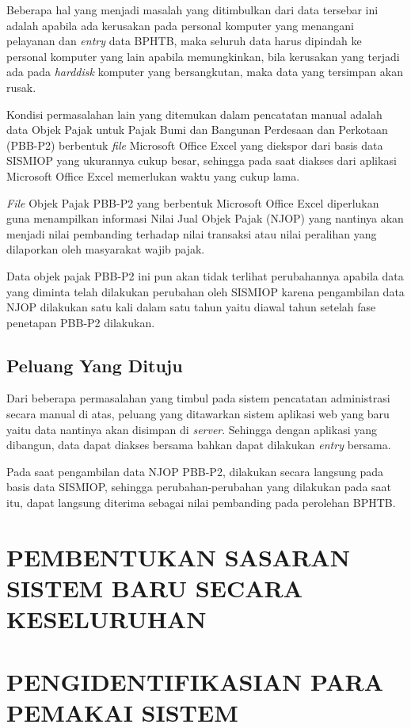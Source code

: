 \documentclass[pdftex,12pt, oneside]{article}
\begin{document}
Beberapa hal yang menjadi masalah yang ditimbulkan dari data tersebar ini adalah apabila ada kerusakan pada personal komputer yang menangani pelayanan dan \textit{entry} data BPHTB, maka seluruh data harus dipindah ke personal komputer yang lain apabila memungkinkan, bila kerusakan yang terjadi ada pada \textit{harddisk} komputer yang bersangkutan, maka data yang tersimpan akan rusak.

Kondisi permasalahan lain yang ditemukan dalam pencatatan manual adalah data Objek Pajak untuk Pajak Bumi dan Bangunan Perdesaan dan Perkotaan (PBB-P2) berbentuk \textit{file} Microsoft Office Excel yang diekspor dari basis data SISMIOP yang ukurannya cukup besar, sehingga pada saat diakses dari aplikasi Microsoft Office Excel memerlukan waktu yang cukup lama.

\textit{File} Objek Pajak PBB-P2 yang berbentuk Microsoft Office Excel diperlukan guna menampilkan informasi Nilai Jual Objek Pajak (NJOP) yang nantinya akan menjadi nilai pembanding terhadap nilai transaksi atau nilai peralihan yang dilaporkan oleh masyarakat wajib pajak.

Data objek pajak PBB-P2 ini pun akan tidak terlihat perubahannya apabila data yang diminta telah dilakukan perubahan oleh SISMIOP karena pengambilan data NJOP dilakukan satu kali dalam satu tahun yaitu diawal tahun setelah fase penetapan PBB-P2 dilakukan.

\subsection{Peluang Yang Dituju}

Dari beberapa permasalahan yang timbul pada sistem pencatatan administrasi secara manual di atas, peluang yang ditawarkan sistem aplikasi web yang baru yaitu data nantinya akan disimpan di \textit{server}. Sehingga dengan aplikasi yang dibangun, data dapat diakses bersama bahkan dapat dilakukan \textit{entry} bersama.

Pada saat pengambilan data NJOP PBB-P2, dilakukan secara langsung pada basis data SISMIOP, sehingga perubahan-perubahan yang dilakukan pada saat itu, dapat langsung diterima sebagai nilai pembanding pada perolehan BPHTB.


\section{PEMBENTUKAN SASARAN SISTEM BARU SECARA KESELURUHAN}


\section{PENGIDENTIFIKASIAN PARA PEMAKAI SISTEM}
\end{document}
